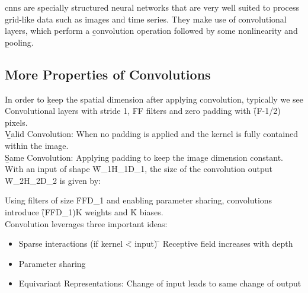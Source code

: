 \acp{cnn} are specially structured neural networks that are very well suited to process grid-like data such as images and time series. They make use of convolutional layers, which perform a \b{convolution operation} followed by some nonlinearity and \b{pooling}.


\subsection{More Properties of Convolutions}
In order to \b{keep the spatial dimension} after applying convolution, typically we see Convolutional layers with stride 1, \f{F\times F} filters and zero padding with \f{(F-1/2)} pixels.\\

\b{Valid Convolution:} When no padding is applied and the kernel is fully contained within the image.\\

\b{Same Convolution:} Applying padding to keep the image dimension constant.\\

With an input of shape \f{W_1\times H_1\times D_1}, the size of the convolution output \f{W_2\times H_2\times D_2} is given by:

\vspace{0.5em}
Using filters of size \f{F\times F\times D_1} and enabling parameter sharing, convolutions introduce \f{(FFD_1)K} weights and \f{K} biases.\\

Convolution leverages three important ideas:
\begin{itemize}
    \item Sparse interactions (if kernel \f{<} input) \f{\to} Receptive field increases with depth
    \item Parameter sharing
    \item Equivariant Representations: Change of input leads to same change of output
\end{itemize}

